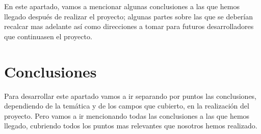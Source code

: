 

En este apartado, vamos a mencionar algunas conclusiones a las que hemos llegado después de realizar el proyecto; algunas partes sobre las que se deberían recalcar mas adelante así como direcciones a tomar para futuros desarrolladores que continuasen el proyecto.



\section{Conclusiones}
Para desarrollar este apartado vamos a ir separando por puntos las conclusiones, dependiendo de la temática y de los campos que cubierto, en la realización del proyecto.
Pero vamos a ir mencionando todas las conclusiones a las que hemos llegado, cubriendo todos los puntos mas relevantes que nosotros hemos realizado.

